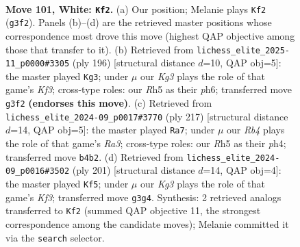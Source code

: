 \documentclass[11pt]{article}
\begin{document}
\clearpage

\begin{figure}[p]\centering
\begin{subfigure}{0.46\textwidth}\centering
\resizebox{\linewidth}{!}{%
\newchessgame
\chessboard[
  setfen={8/3k4/r3p3/7R/1R2P3/5PK1/8/8 w - - 5 101},
  showmover=false,
  pgfstyle=straightmove, color=movearrow, markmove={g3-f2}
]}
\caption{}
\end{subfigure}\hfill
\begin{subfigure}{0.46\textwidth}\centering
\resizebox{\linewidth}{!}{%
\newchessgame
\chessboard[
  setfen={6k1/6p1/1r5p/R6P/6P1/5K2/8/8 w - - 53 99},
  showmover=false,
  pgfstyle=straightmove, color=movearrow, markmove={f3-g3}
]}
\caption{}
\end{subfigure}
\\[4pt]
\begin{subfigure}{0.46\textwidth}\centering
\resizebox{\linewidth}{!}{%
\newchessgame
\chessboard[
  setfen={8/8/r5pk/7p/7P/1R4P1/7K/8 b - - 55 109},
  showmover=false,
  pgfstyle=straightmove, color=movearrow, markmove={a6-a7}
]}
\caption{}
\end{subfigure}\hfill
\begin{subfigure}{0.46\textwidth}\centering
\resizebox{\linewidth}{!}{%
\newchessgame
\chessboard[
  setfen={8/8/5kp1/8/5P2/6K1/3r3p/R7 b - - 25 101},
  showmover=false,
  pgfstyle=straightmove, color=movearrow, markmove={f6-f5}
]}
\caption{}
\end{subfigure}
\caption{\textbf{Move 101, White: \texttt{Kf2}.} (a) Our position; Melanie plays \texttt{Kf2} (\texttt{g3f2}). Panels (b)--(d) are the retrieved master positions whose correspondence most drove this move (highest QAP objective among those that transfer to it). (b) Retrieved from \texttt{lichess\_elite\_2025-11\_p0000\#3305} (ply 196) [structural distance $d$=10, QAP obj=5]: the master played \texttt{Kg3}; under $\mu$ our \emph{Kg3} plays the role of that game's \emph{Kf3}; cross-type roles: our \emph{R}h5 as their \emph{p}h6; transferred move \texttt{g3f2} \textbf{(endorses this move)}. (c) Retrieved from \texttt{lichess\_elite\_2024-09\_p0017\#3770} (ply 217) [structural distance $d$=14, QAP obj=5]: the master played \texttt{Ra7}; under $\mu$ our \emph{Rb4} plays the role of that game's \emph{Ra3}; cross-type roles: our \emph{R}h5 as their \emph{p}h4; transferred move \texttt{b4b2}. (d) Retrieved from \texttt{lichess\_elite\_2024-09\_p0016\#3502} (ply 201) [structural distance $d$=14, QAP obj=4]: the master played \texttt{Kf5}; under $\mu$ our \emph{Kg3} plays the role of that game's \emph{Kf3}; transferred move \texttt{g3g4}. Synthesis: 2 retrieved analogs transferred to \texttt{Kf2} (summed QAP objective 11, the strongest correspondence among the candidate moves); Melanie committed it via the \texttt{search} selector.}
\label{fig:thought-m200}
\end{figure}
\end{document}
